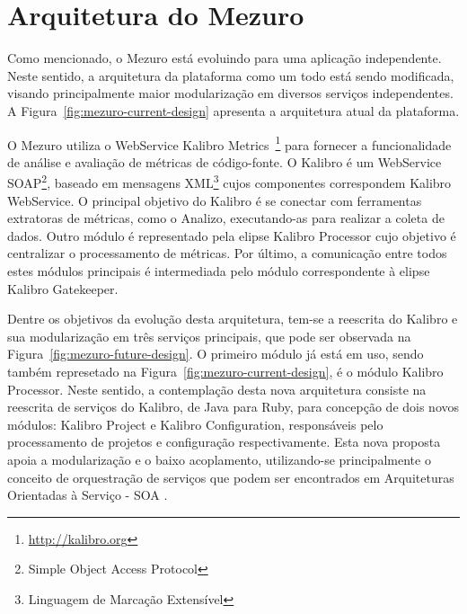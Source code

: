 %

\section{Arquitetura do Mezuro}
\label{sec-mezuro-design}

Como mencionado, o Mezuro está evoluindo para uma aplicação independente. Neste sentido, a arquitetura da plataforma como um todo está sendo modificada, visando principalmente maior modularização em diversos serviços independentes. A Figura~\ref{fig:mezuro-current-design} apresenta a arquitetura atual da plataforma.


%

O Mezuro utiliza o WebService Kalibro Metrics~\footnote{\url{http://kalibro.org}} para fornecer a funcionalidade de análise e avaliação de métricas de código-fonte. O Kalibro é um WebService SOAP\footnote{Simple Object Access Protocol}, baseado em mensagens XML\footnote{Linguagem de Marcação Extensível} cujos componentes correspondem Kalibro WebService. O principal objetivo do Kalibro é se conectar com ferramentas extratoras de métricas, como o Analizo, executando-as para realizar a coleta de dados. Outro módulo é representado pela elipse Kalibro Processor cujo objetivo é centralizar o processamento de métricas. Por último, a comunicação entre todos estes módulos principais é intermediada pelo módulo correspondente à elipse Kalibro Gatekeeper.

%

Dentre os objetivos da evolução desta arquitetura, tem-se a reescrita do Kalibro e sua modularização em três serviços principais, que pode ser observada na Figura~\ref{fig:mezuro-future-design}. O primeiro módulo já está em uso, sendo também represetado na Figura~\ref{fig:mezuro-current-design}, é o módulo Kalibro Processor. Neste sentido, a contemplação desta nova arquitetura consiste na reescrita de serviços do Kalibro, de Java para Ruby, para concepção de dois novos módulos: Kalibro Project e Kalibro Configuration, responsáveis pelo processamento de projetos e configuração respectivamente. Esta nova proposta apoia a modularização e o baixo acoplamento, utilizando-se principalmente o conceito de orquestração de serviços que podem ser encontrados em Arquiteturas Orientadas à Serviço - SOA \cite{thomaserl2007}.

